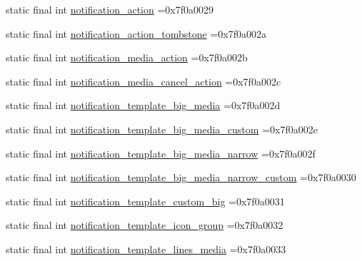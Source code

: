 \begin{DoxyCompactItemize}
\item 
static final int \mbox{\hyperlink{classbr_1_1unb_1_1cic_1_1mp_1_1marketmaster_1_1test_1_1R_1_1layout_ae3c6f2d70c8e8ee8dc849f161503522d}{notification\+\_\+action}} =0x7f0a0029
\item 
static final int \mbox{\hyperlink{classbr_1_1unb_1_1cic_1_1mp_1_1marketmaster_1_1test_1_1R_1_1layout_a8126a6e815577d59448cf5bf486ab516}{notification\+\_\+action\+\_\+tombstone}} =0x7f0a002a
\item 
static final int \mbox{\hyperlink{classbr_1_1unb_1_1cic_1_1mp_1_1marketmaster_1_1test_1_1R_1_1layout_a83b015be36edec86532e3cb0a2716f19}{notification\+\_\+media\+\_\+action}} =0x7f0a002b
\item 
static final int \mbox{\hyperlink{classbr_1_1unb_1_1cic_1_1mp_1_1marketmaster_1_1test_1_1R_1_1layout_a46270af241ae3914501ce622d3329e88}{notification\+\_\+media\+\_\+cancel\+\_\+action}} =0x7f0a002c
\item 
static final int \mbox{\hyperlink{classbr_1_1unb_1_1cic_1_1mp_1_1marketmaster_1_1test_1_1R_1_1layout_ac4e212468ab9155f606b19b76f874f1e}{notification\+\_\+template\+\_\+big\+\_\+media}} =0x7f0a002d
\item 
static final int \mbox{\hyperlink{classbr_1_1unb_1_1cic_1_1mp_1_1marketmaster_1_1test_1_1R_1_1layout_a67e6e6631ebf3eea93c90088e75275bb}{notification\+\_\+template\+\_\+big\+\_\+media\+\_\+custom}} =0x7f0a002e
\item 
static final int \mbox{\hyperlink{classbr_1_1unb_1_1cic_1_1mp_1_1marketmaster_1_1test_1_1R_1_1layout_ad96a168572e3569b0502c426a5a8e2dc}{notification\+\_\+template\+\_\+big\+\_\+media\+\_\+narrow}} =0x7f0a002f
\item 
static final int \mbox{\hyperlink{classbr_1_1unb_1_1cic_1_1mp_1_1marketmaster_1_1test_1_1R_1_1layout_a1084b5c2f1ef62822373495abd911fa5}{notification\+\_\+template\+\_\+big\+\_\+media\+\_\+narrow\+\_\+custom}} =0x7f0a0030
\item 
static final int \mbox{\hyperlink{classbr_1_1unb_1_1cic_1_1mp_1_1marketmaster_1_1test_1_1R_1_1layout_a32d3099d6e2983955dda4fde1a773771}{notification\+\_\+template\+\_\+custom\+\_\+big}} =0x7f0a0031
\item 
static final int \mbox{\hyperlink{classbr_1_1unb_1_1cic_1_1mp_1_1marketmaster_1_1test_1_1R_1_1layout_a62e8d47f660a7f5280340a3a5c930176}{notification\+\_\+template\+\_\+icon\+\_\+group}} =0x7f0a0032
\item 
static final int \mbox{\hyperlink{classbr_1_1unb_1_1cic_1_1mp_1_1marketmaster_1_1test_1_1R_1_1layout_a9f21387f69bfc4609b43b24039d09734}{notification\+\_\+template\+\_\+lines\+\_\+media}} =0x7f0a0033

\end{DoxyCompactItemize}
